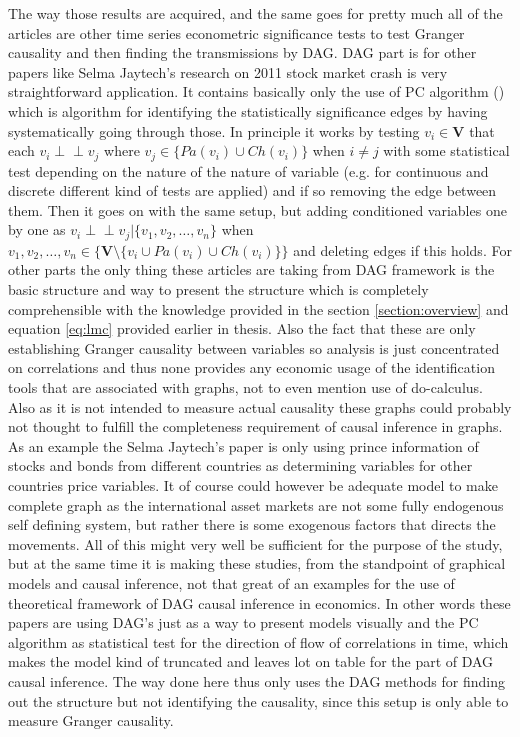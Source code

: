 \documentclass[main=english,12pt,a4paper,pdftex,econ,utf8]{aaltothesis}
\newcommand{\indep}{\perp \!\!\! \perp}
\newcommand{\ch}[1]{Ch(#1)}
\newcommand{\pa}[1]{Pa(#1)}
\newcommand{\vars}{\bm{V}}
\begin{document}
The way those results are acquired, and the same goes for pretty much all of the articles are other time series econometric significance tests to test Granger causality and then finding the transmissions by DAG. DAG part is for other papers like Selma Jaytech's research on 2011 stock market crash is very straightforward application. It contains basically only the use of PC algorithm (\cite{Spirtes2000}) which is algorithm for identifying the statistically significance edges by having systematically going through those. In principle it works by testing $v_{i}\in\vars$ that each $v_{i}\indep v_{j}$ where $v_{j}\in\{\pa{v_{i}}\cup\ch{v_{i}}\}$ when $i\neq j$ with some statistical test depending on the nature of the nature of variable (e.g. for continuous and discrete different kind of tests are applied) and if so removing the edge between them. Then it goes on with the same setup, but adding conditioned variables one by one as $v_{i}\indep v_{j}|\{v_{1},v_{2},\ldots,v_{n}\}$ when $v_{1},v_{2},\ldots,v_{n}\in\{\vars\setminus\{v_{i}\cup\pa{v_{i}}\cup\ch{v_{i}}\}\}$ and deleting edges if this holds. For other parts the only thing these articles are taking from DAG framework is the basic structure and way to present the structure which is completely comprehensible with the knowledge provided in the section \ref{section:overview} and equation \ref{eq:lmc} provided earlier in thesis.
Also the fact that these are only establishing Granger causality between variables so analysis is just concentrated on correlations and thus none provides any economic usage of the identification tools that are associated with graphs, not to even mention use of do-calculus. Also as it is not intended to measure actual causality these graphs could probably not thought to fulfill the completeness requirement of causal inference in graphs. As an example the Selma Jaytech's paper is only using prince information of stocks and bonds from different countries as determining variables for other countries price variables. It of course could however be adequate model to make complete graph as the international asset markets are not some fully endogenous self defining system, but rather there is some exogenous factors that directs the movements. All of this might very well be sufficient for the purpose of the study, but at the same time it is making these studies, from the standpoint of graphical models and causal inference, not that great of an examples for the use of theoretical framework of DAG causal inference in economics. In other words these papers are using DAG's just as a way to present models visually and the PC algorithm as statistical test for the direction of flow of correlations in time, which makes the model kind of truncated and leaves lot on table for the part of DAG causal inference. The way done here thus only uses the DAG methods for finding out the structure but not identifying the causality, since this setup is only able to measure Granger causality.
\end{document}
